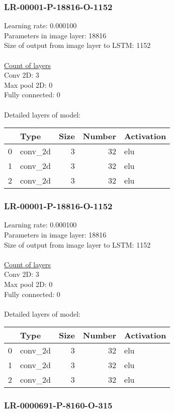 \subsubsection*{LR-00001-P-18816-O-1152}
Learning rate: 0.000100
\\Parameters in image layer: 18816
\\Size of output from image layer to LSTM: 1152
\\\\\underline{Count of layers} 
\\Conv 2D:           3\\Max pool 2D:      0\\Fully connected:  0
\\\\Detailed layers of model: \\\begin{tabular}{rlrrl}
\hline
    & Type    &   Size &   Number & Activation   \\
\hline
  0 & conv\_2d &      3 &       32 & elu          \\
  1 & conv\_2d &      3 &       32 & elu          \\
  2 & conv\_2d &      3 &       32 & elu          \\
\hline
\end{tabular}\subsubsection*{LR-00001-P-18816-O-1152}
Learning rate: 0.000100
\\Parameters in image layer: 18816
\\Size of output from image layer to LSTM: 1152
\\\\\underline{Count of layers} 
\\Conv 2D:           3\\Max pool 2D:      0\\Fully connected:  0
\\\\Detailed layers of model: \\\begin{tabular}{rlrrl}
\hline
    & Type    &   Size &   Number & Activation   \\
\hline
  0 & conv\_2d &      3 &       32 & elu          \\
  1 & conv\_2d &      3 &       32 & elu          \\
  2 & conv\_2d &      3 &       32 & elu          \\
\hline
\end{tabular}\subsubsection*{LR-0000691-P-8160-O-315}

